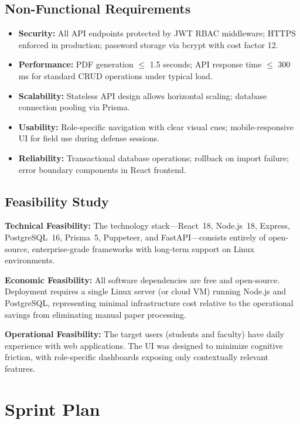 \documentclass[12pt]{report}
\begin{document}
\subsection{Non-Functional Requirements}

\begin{itemize}[leftmargin=*]
  \item \textbf{Security:} All API endpoints protected by JWT RBAC middleware; HTTPS enforced in production; password storage via bcrypt with cost factor 12.
  \item \textbf{Performance:} PDF generation $\leq$ 1.5 seconds; API response time $\leq$ 300\,ms for standard CRUD operations under typical load.
  \item \textbf{Scalability:} Stateless API design allows horizontal scaling; database connection pooling via Prisma.
  \item \textbf{Usability:} Role-specific navigation with clear visual cues; mobile-responsive UI for field use during defense sessions.
  \item \textbf{Reliability:} Transactional database operations; rollback on import failure; error boundary components in React frontend.
\end{itemize}

\subsection{Feasibility Study}

\textbf{Technical Feasibility:} The technology stack---React~18, Node.js~18, Express, PostgreSQL~16, Prisma~5, Puppeteer, and FastAPI---consists entirely of open-source, enterprise-grade frameworks with long-term support on Linux environments.

\textbf{Economic Feasibility:} All software dependencies are free and open-source. Deployment requires a single Linux server (or cloud VM) running Node.js and PostgreSQL, representing minimal infrastructure cost relative to the operational savings from eliminating manual paper processing.

\textbf{Operational Feasibility:} The target users (students and faculty) have daily experience with web applications. The UI was designed to minimize cognitive friction, with role-specific dashboards exposing only contextually relevant features.

\section{Sprint Plan}
\end{document}
